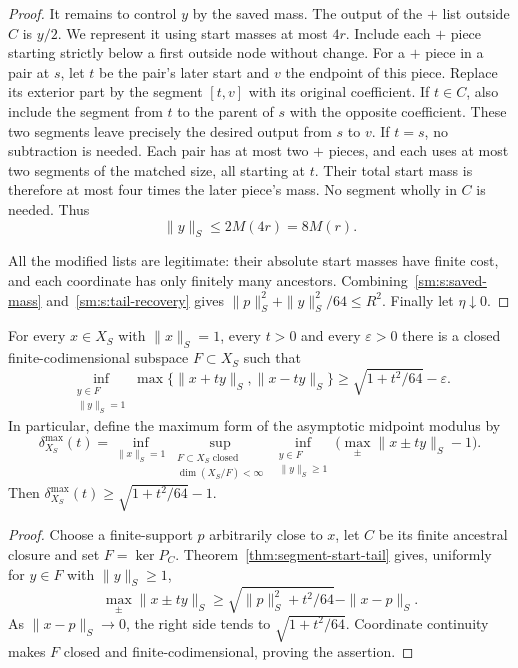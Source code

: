 \begin{proof}
It remains to control $y$ by the saved mass. The output of the $+$ list
outside $C$ is $y/2$. We represent it using start masses at most $4r$.
Include each $+$ piece starting strictly below a first outside node
without change. For a $+$ piece in a pair at $s$, let $t$ be the pair's
later start and $v$ the endpoint of this piece. Replace its exterior part
by the segment $[t,v]$ with its original coefficient. If $t\in C$, also
include the segment from $t$ to the parent of $s$ with the opposite
coefficient. These two segments leave precisely the desired output
from $s$ to $v$. If $t=s$, no subtraction is needed. Each pair has at most
two $+$ pieces, and each uses at most two segments of the matched size,
all starting at $t$. Their total start mass is therefore at most four
times the later piece's mass. No segment wholly in $C$ is needed. Thus
\begin{equation}\label{sm:s:tail-recovery}
 \|y\|_S\le2M(4r)=8M(r).
\end{equation}

All the modified lists are legitimate: their absolute start masses have
finite cost, and each coordinate has only finitely many ancestors.
Combining~\eqref{sm:s:saved-mass} and~\eqref{sm:s:tail-recovery} gives
$\|p\|_S^2+\|y\|_S^2/64\le R^2$. Finally let $\eta\downarrow0$.
\end{proof}

\begin{corollary}\label{sm:s:midpoint-consequence}
For every $x\in X_S$ with $\|x\|_S=1$, every $t>0$ and every $\varepsilon>0$
there is a closed finite-codimensional subspace $F\subset X_S$ such that
\[
 \inf_{\substack{y\in F\\\|y\|_S=1}}
 \max\{\|x+ty\|_S,\|x-ty\|_S\}
 \ge\sqrt{1+t^2/64}-\varepsilon.
\]
In particular, define the maximum form of the asymptotic midpoint modulus
by
\[
 \delta^{\max}_{X_S}(t)=
 \inf_{\|x\|_S=1}\sup_{\substack{F\subset X_S\text{ closed}\\\dim(X_S/F)<\infty}}
 \inf_{\substack{y\in F\\\|y\|_S\ge1}}
 \bigl(\max_{\pm}\|x\pm ty\|_S-1\bigr).
\]
Then $\delta^{\max}_{X_S}(t)\ge\sqrt{1+t^2/64}-1$.
\end{corollary}
\begin{proof}
Choose a finite-support $p$ arbitrarily close to $x$, let $C$ be its finite
ancestral closure and set $F=\ker P_C$. Theorem~\ref{thm:segment-start-tail}
gives, uniformly for $y\in F$ with $\|y\|_S\ge1$,
\[
 \max_{\pm}\|x\pm ty\|_S
 \ge\sqrt{\|p\|_S^2+t^2/64}-\|x-p\|_S.
\]
As $\|x-p\|_S\to0$, the right side tends to
$\sqrt{1+t^2/64}$. Coordinate continuity makes $F$ closed and
finite-codimensional, proving the assertion.
\end{proof}

